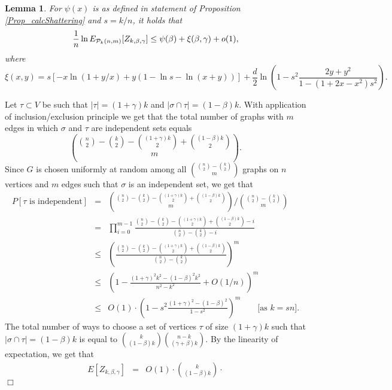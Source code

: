 \documentclass[a4paper,10pt]{article}
\makeatletter
\newtheorem{lemma}{Lemma}\renewcommand{\thelemma}{\arabic{lemma}}
\newenvironment{proof}{\noindent{\bf Proof\@:}}{\hfill $\Box$\\}
\makeatother
\begin{document}
\begin{lemma}\label{lemma:PsiXiExpctation}
For $\psi(x)$ is as defined in statement of Proposition \ref{Prop_calcShattering}
and $s=k/n$, it holds that 
$$\frac{1}{n}\ln E_{{\cal P}_k(n,m)}[Z_{k,\beta,\gamma}]\leq \psi(\beta)+\xi(\beta,\gamma)+o(1),$$ 
where 
\begin{displaymath}
\xi (x,y)=
s[-x \ln(1+y/x)
+y (1-\ln s-\ln(x+y))]+
\frac{d}{2}\ln \left(1-s^2\frac{2y+y^2}{1-(1+2x-x^2)s^2}\right).
\end{displaymath}
 
\end{lemma}
\begin{proof}
Let $\tau\subset V$ be such that $|\tau|=(1+\gamma)k$ and $|\sigma\cap \tau|=(1-\beta)k$.
With application of inclusion/exclusion principle we get that the total number of graphs
with $m$ edges in which $\sigma$ and $\tau$ are independent sets equals
\begin{displaymath}
{{n \choose 2}-{k\choose 2}-{(1+\gamma)k \choose 2}+ {(1-\beta)k \choose 2} \choose m}.
\end{displaymath}
Since $G$ is chosen uniformly at random among all ${{n \choose 2}-{k\choose 2} \choose m}$
graphs on $n$ vertices and $m$ edges such that $\sigma$ is an independent set, we get that
\begin{eqnarray*}
P[\tau \textrm{ is independent}]&=& 
{{n \choose 2}-{k\choose 2}-{(1+\gamma)k \choose 2}+ {(1-\beta)k \choose 2} \choose m}/
{{n \choose 2}-{k\choose 2} \choose m}\\ 
&=&
\prod_{i=0}^{m-1}\frac{{n \choose 2}-{k\choose 2}-{(1+\gamma)k \choose 2}+ {(1-\beta)k \choose 2}-i}{{n \choose 2}-{k\choose 2}-i} \\ 
&\leq &  
\left( \frac{{n \choose 2}-{k\choose 2}-{(1+\gamma)k \choose 2}+ {(1-\beta)k \choose 2}}
{{n \choose 2}-{k\choose 2}} \right)^m
\\ 
&\leq & 
\left( 1-\frac{(1+\gamma)^2k^2- (1-\beta)^2k^2 }{n^2-k^2} +O(1/n)\right)^m \\ 
&\leq & 
O(1)\cdot \left( 1-s^2\frac{(1+\gamma)^2- (1-\beta)^2 }
{1-s^2}\right)^m \qquad \mbox{[as $k=sn$].}
\end{eqnarray*}
The total number of ways to choose a set of vertices $\tau$ of 
size $(1+\gamma)k$ such that $|\sigma\cap \tau|=(1-\beta)k$ is 
equal to ${k \choose (1-\beta)k}{n-k \choose (\gamma+\beta)k}$. 
By the linearity of expectation, we get that
\begin{eqnarray}
E[Z_{k,\beta,\gamma}]&=& \displaystyle O(1)\cdot {k \choose (1-\beta)k}\cdot 

\end{eqnarray}
\end{proof}
\end{document}
